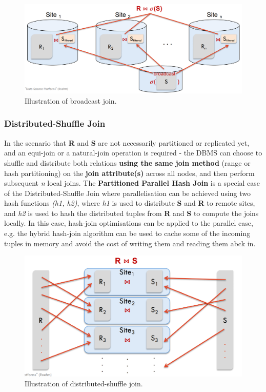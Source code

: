 \begin{figure}[h]
  \centering
  \includegraphics[width=\linewidth]{figures/broadcast-join.png}
  \caption{Illustration of broadcast join.}
  \label{fig:broadcast-join}
\end{figure}

\subsubsection{Distributed-Shuffle Join}
In the scenario that \textbf{R} and \textbf{S} are not necessarily partitioned or replicated yet, and an equi-join or a natural-join operation is required - the DBMS can choose to shuffle and distribute both relations \textbf{using the same join method} (range or hash partitioning) on the \textbf{join attribute(s)} across all nodes, and then perform subsequent \textit{n} local joins. The \textbf{Partitioned Parallel Hash Join} is a special case of the Distributed-Shuffle Join where parallelisation can be achieved using two hash functions \textit{(h1, h2)}, where \textit{h1} is used to distribute \textbf{S} and \textbf{R} to remote sites, and \textit{h2} is used to hash the distributed tuples from \textbf{R} and \textbf{S} to compute the joins locally. In this case, hash-join optimisations can be applied to the parallel case, e.g. the hybrid hash-join algorithm can be used to cache some of the incoming tuples in memory and avoid the cost of writing them and reading them abck in. 

\begin{figure}[h]
  \centering
  \includegraphics[width=\linewidth]{figures/shuffle-join.png}
  \caption{Illustration of distributed-shuffle join.}
  \label{fig:shuffle-join}
\end{figure}

